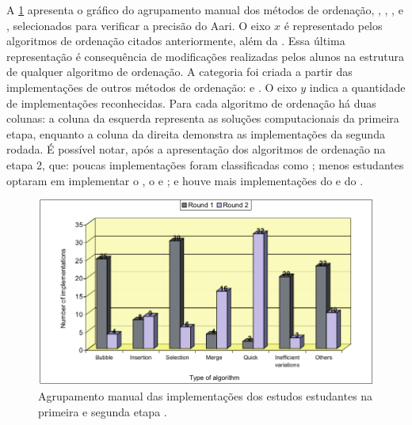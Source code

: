 		A \cref{fig:clusterManual} apresenta o gráfico do agrupamento manual
		dos métodos de ordenação, , ,
		,  e ,
		selecionados para verificar a precisão do Aari. O eixo $x$ é representado
		pelos algoritmos de ordenação citados anteriormente, além da
		. Essa última representação é consequência
		de modificações realizadas pelos alunos na estrutura de qualquer algoritmo de
		ordenação. A categoria  foi criada a partir das implementações
		de outros métodos de ordenação:  e . O
		eixo $y$ indica a quantidade de implementações reconhecidas. Para cada algoritmo
		de ordenação há duas colunas: a coluna da esquerda representa as soluções
		computacionais da primeira etapa, enquanto a coluna da direita demonstra as
		implementações da segunda rodada. É possível notar, após a apresentação dos
		algoritmos de ordenação na etapa 2, que: poucas implementações foram classificadas
		como ; menos estudantes optaram em implementar o
		, o  e ; e houve
		mais implementações do  e do .
		
		\begin{figure}[h]
			\centering
			\includegraphics[scale=0.4]{imagem/clusterManual.png}
			\caption[Agrupamento manual das implementações dos estudos estudantes na
			primeira e segunda etapa]{Agrupamento manual das implementações dos estudos estudantes na
			primeira e segunda etapa \cite{Taherkhani:2012}.}
			\label{fig:clusterManual}
		\end{figure}
		
